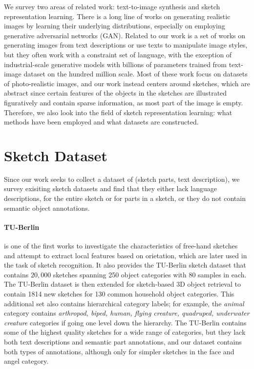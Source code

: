 
We survey two areas of related work: text-to-image synthesis and sketch representation learning. There is a long line of works on generating realistic images by learning their underlying distributions, especially on employing generative adversarial networks (GAN). 
Related to our work is a set of works on generating images from text descriptions or use texts to manipulate image styles, but they often work with a constraint set of language, with the exception of industrial-scale generative models with billions of parameters trained from text-image dataset on the hundred million scale.
Most of these work focus on datasets of photo-realistic images, and our work instead centers around sketches, which are abstract since certain features of the objects in the sketches are illustrated figuratively and contain sparse information, as most part of the image is empty. 
Therefore, we also look into the field of sketch representation learning: what methods have been employed and what datasets are constructed.   




\section{Sketch Dataset} \label{related.sketch.datasets}
Since our work seeks to collect a dataset of (sketch parts, text description), we survey exisiting sketch datasets and find that they either lack language descriptions, for the entire sketch or for parts in a sketch, or they do not contain semantic object annotations. 

\paragraph{TU-Berlin}
\citet{eitz2012hdhso} is one of the first works to investigate the characteristics of free-hand sketches and attempt to extract local features based on orietation, which are later used in the task of sketch recognition. It also provides the TU-Berlin sketch dataset that contains $20,000$ sketches spanning 250 object categories with 80 samples in each. The TU-Berlin dataset is then extended for sketch-based 3D object retrieval to contain 1814 new sketches for 130 common household object categories. This additional set also contains hierarchical category labels; for example, the \textit{animal} category contains \textit{arthropod, biped, human, flying creature, quadruped, underwater creature} categories if going one level down the hierarchy. The TU-Berlin contains some of the highest quality sketches for a wide range of categories, but they lack both text descriptions and semantic part annotations, and our dataset contains both types of annotations, although only for simpler sketches in the face and angel category.    

